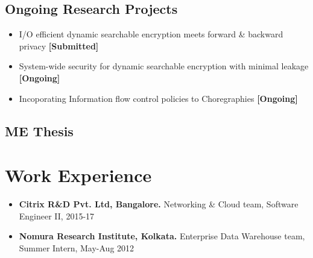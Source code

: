 \documentclass[9pt,a4paper]{moderncv}
\begin{document}
\subsection{Ongoing Research Projects}
\begin{itemize}
\item I/O efficient dynamic searchable encryption meets forward \& backward privacy \textbf{\textsf{[Submitted]}}
\item System-wide security for dynamic searchable encryption with minimal leakage \textsf{\textbf{[Ongoing]}}
\item Incoporating Information flow control policies to Choregraphies \textsf{\textbf{[Ongoing]}}
\end{itemize}
\subsection{ME Thesis}
\section{Work Experience}
\begin{itemize}
\item \textbf{Citrix R\&D Pvt. Ltd, Bangalore.} Networking \& Cloud team, Software Engineer II, 2015-17
\item \textbf{Nomura Research Institute, Kolkata.} Enterprise Data Warehouse team, Summer Intern, May-Aug 2012
\end{itemize}
\end{document}
